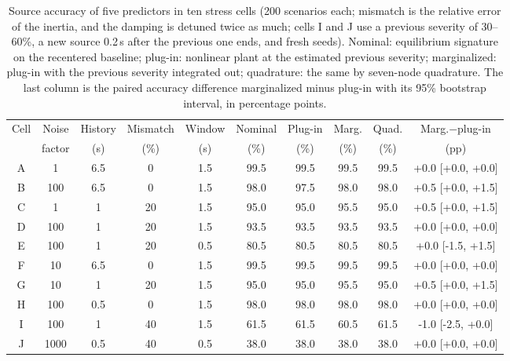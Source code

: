 \begin{table}[t]\centering\footnotesize\setlength{\tabcolsep}{3pt}
\caption{Source accuracy of five predictors in ten stress cells (200 scenarios each; mismatch is the relative error of the inertia, and the damping is detuned twice as much; cells I and J use a previous severity of 30--60\%, a new source 0.2\,s after the previous one ends, and fresh seeds). Nominal: equilibrium signature on the recentered baseline; plug-in: nonlinear plant at the estimated previous severity; marginalized: plug-in with the previous severity integrated out; quadrature: the same by seven-node quadrature. The last column is the paired accuracy difference marginalized minus plug-in with its 95\% bootstrap interval, in percentage points.}
\label{tab:history-conditioning}
\begin{tabular}{cccccccccc}\toprule
Cell & Noise & History & Mismatch & Window & Nominal & Plug-in & Marg. & Quad. & Marg.$-$plug-in \\
 & factor & (s) & (\%) & (s) & (\%) & (\%) & (\%) & (\%) & (pp) \\\midrule
A & 1 & 6.5 & 0 & 1.5 & 99.5 & 99.5 & 99.5 & 99.5 & +0.0 [+0.0, +0.0] \\
B & 100 & 6.5 & 0 & 1.5 & 98.0 & 97.5 & 98.0 & 98.0 & +0.5 [+0.0, +1.5] \\
C & 1 & 1 & 20 & 1.5 & 95.0 & 95.0 & 95.5 & 95.0 & +0.5 [+0.0, +1.5] \\
D & 100 & 1 & 20 & 1.5 & 93.5 & 93.5 & 93.5 & 93.5 & +0.0 [+0.0, +0.0] \\
E & 100 & 1 & 20 & 0.5 & 80.5 & 80.5 & 80.5 & 80.5 & +0.0 [-1.5, +1.5] \\
F & 10 & 6.5 & 0 & 1.5 & 99.5 & 99.5 & 99.5 & 99.5 & +0.0 [+0.0, +0.0] \\
G & 10 & 1 & 20 & 1.5 & 95.0 & 95.0 & 95.5 & 95.0 & +0.5 [+0.0, +1.5] \\
H & 100 & 0.5 & 0 & 1.5 & 98.0 & 98.0 & 98.0 & 98.0 & +0.0 [+0.0, +0.0] \\
\midrule
I & 100 & 1 & 40 & 1.5 & 61.5 & 61.5 & 60.5 & 61.5 & -1.0 [-2.5, +0.0] \\
J & 1000 & 0.5 & 40 & 0.5 & 38.0 & 38.0 & 38.0 & 38.0 & +0.0 [+0.0, +0.0] \\
\bottomrule\end{tabular}\end{table}
